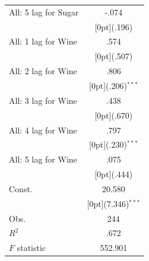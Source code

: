 \documentclass[12pt,a4paper,titlepage]{article}
\begin{document}
{\begin{tabular*}{\textwidth}{@{\extracolsep{\fill}}lc}
All: 5 lag for Sugar &	-.074 \\
&	\raisebox{.7ex}[0pt]{\scriptsize (.196)} \\
All: 1 lag for Wine &	.574 \\
&	\raisebox{.7ex}[0pt]{\scriptsize (.507)} \\
All: 2 lag for Wine &	.806 \\
&	\raisebox{.7ex}[0pt]{\scriptsize (.206)$^{***}$} \\
All: 3 lag for Wine &	.438 \\
&	\raisebox{.7ex}[0pt]{\scriptsize (.670)} \\
All: 4 lag for Wine &	.797 \\
&	\raisebox{.7ex}[0pt]{\scriptsize (.230)$^{***}$} \\
All: 5 lag for Wine &	.075 \\
&	\raisebox{.7ex}[0pt]{\scriptsize (.444)} \\
Const. &	20.580 \\
&	\raisebox{.7ex}[0pt]{\scriptsize (7.346)$^{***}$} \\
Obs. &	244 \\
$ R^2$ &	.672 \\
$ F$ statistic &	552.901 \\
\hline\hline	
\end{tabular*}%


}
\end{document}
